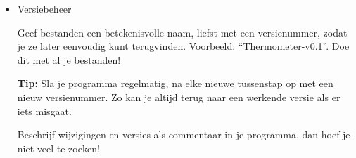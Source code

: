 \begin{itemize}
\item Versiebeheer

Geef bestanden een betekenisvolle naam, liefst met een versienummer, zodat je ze later eenvoudig kunt terugvinden. Voorbeeld: “Thermometer-v0.1”. Doe dit met al je bestanden!

\textbf{Tip:} Sla je programma regelmatig, na elke nieuwe tussenstap op met een nieuw versienummer. 
Zo kan je altijd terug naar een werkende versie als er iets misgaat. 

Beschrijf wijzigingen en versies als commentaar in je programma, dan hoef je niet veel te zoeken!
\end{itemize}